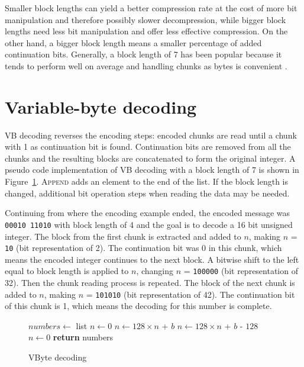 Smaller block lengths can yield a better compression rate at the cost of more bit manipulation and therefore possibly slower decompression, while bigger block lengths need less bit manipulation and 
offer less effective compression. On the other hand, a bigger block length means a smaller percentage of added continuation bits.
Generally, a block length of 7 has been popular because it tends to perform well on average and handling chunks as bytes is 
convenient \citep{Man08}.


\section{Variable-byte decoding}
VB decoding reverses the encoding steps: encoded chunks are read until a chunk with 1 as continuation bit is found. Continuation bits 
are removed from all the chunks and the resulting blocks are concatenated to form the original integer. A pseudo code implementation of VB decoding with a block length of 7 is shown in Figure~\ref{vbyte_dec}.
\textsc{Append} adds an element to the end of the list. If the block length is changed, additional bit operation steps when reading the data may be needed.

Continuing from where the encoding example ended, the encoded message was \texttt{00010 11010} with block length of 4 and the goal is to decode a 16 bit unsigned integer. The block from the first chunk is 
extracted and added to $n$, making $n$ = \texttt{10} (bit representation of 2).
The continuation bit was 0 in this chunk, which means the encoded integer continues to the next block. A bitwise shift to the left equal to block length is applied to $n$, 
changing $n$ = \texttt{100000} (bit representation of 32). Then the chunk reading process is repeated. The block of the next chunk is added to $n$, making 
$n$ = \texttt{101010} (bit representation of 42). The continuation bit of this chunk is 1, which means the decoding for this number is complete. 

\begin{figure}[ht]
\centering
  \begin{minipage}{0.5\linewidth}
\begin{algorithmic}[H]
\State $numbers\gets $ list
\State $n\gets 0$
\State $n\gets 128\times n $ + $b$
\Else
\State $n\gets 128\times n $ + $b$ - $128$
\State {}
\State $n\gets 0$
\EndIf
\EndFor
\State \textbf{return} numbers
\EndFunction
\end{algorithmic}
\end{minipage}
\caption{VByte decoding} \label{vbyte_dec}
\end{figure}

